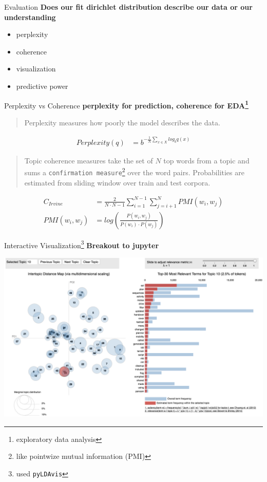 \documentclass[10pt]{beamer}
\begin{document}
\begin{frame}{Evaluation}
  {\bf Does our fit dirichlet distribution describe our data or our understanding}

  \begin{itemize}
  \item perplexity
  \item coherence
  \item visualization
  \item predictive power
  \end{itemize}
\end{frame}

\begin{frame}{Perplexity vs Coherence}
  {\bf perplexity for prediction, coherence for EDA\footnote{exploratory data analysis}}

  \begin{quote}
    Perplexity measures how poorly the model describes the data.
  \end{quote}

  \begin{align*}
    Perplexity(q) &= b^{-\frac{1}{N}\sum_{x \in X} log_b q(x)}
  \end{align*}

  \begin{quote}
    Topic coherence measures take the set of $N$ top words from a topic and sums a \texttt{confirmation measure}\footnote{like pointwize mutual information (PMI)} over the word pairs. Probabilities are estimated from sliding window over train and test corpora.
  \end{quote}

  \begin{align*}
    C_{Irvine} &= \frac{2}{N\cdot N-1}\sum_{i=1}^{N-1}\sum_{j=i+1}^N PMI(w_i, w_j)\\
    PMI(w_i, w_j) &= log(\frac{P(w_i, w_j)}{P(w_i)\cdot P(w_j)})
  \end{align*}
\end{frame}

\begin{frame}{Interactive Visualization\footnote{used \texttt{pyLDAvis}}}
  {\bf Breakout to jupyter}

    \includegraphics[width=\textwidth]{LDAvis.png}

\end{frame}
\end{document}
